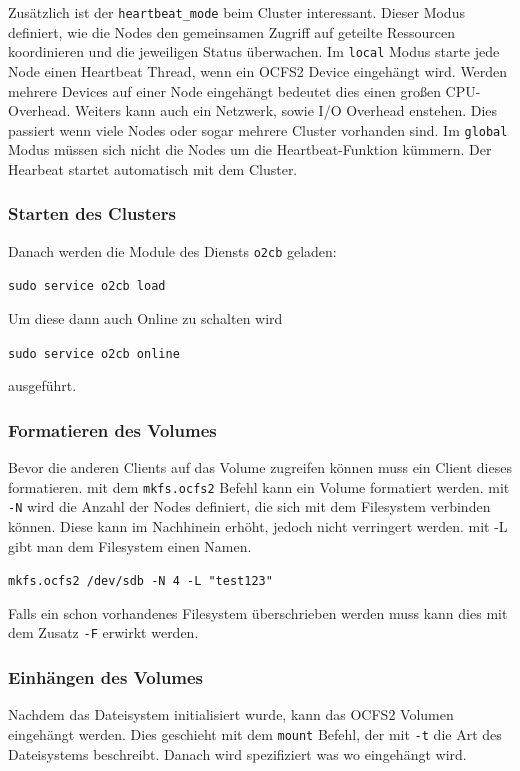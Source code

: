 Zusätzlich ist der \texttt{heartbeat\_mode} beim Cluster interessant. Dieser Modus definiert, wie die Nodes den gemeinsamen Zugriff auf geteilte Ressourcen koordinieren und die jeweiligen Status überwachen. Im \texttt{local} Modus starte jede Node einen Heartbeat Thread, wenn ein OCFS2 Device eingehängt wird. Werden mehrere Devices auf einer Node eingehängt bedeutet dies einen großen CPU-Overhead. Weiters kann auch ein Netzwerk, sowie I/O Overhead enstehen. Dies passiert wenn viele Nodes oder sogar mehrere Cluster vorhanden sind.   Im \texttt{global} Modus müssen sich nicht die Nodes um die Heartbeat-Funktion kümmern. Der Hearbeat startet automatisch mit dem Cluster. \cite{heartbeat}
\subsubsection{Starten des Clusters}
Danach werden die Module des Diensts \texttt{o2cb} geladen:

\texttt{sudo service o2cb load}

Um diese dann auch Online zu schalten wird

\texttt{sudo service o2cb online}

ausgeführt. \cite{ocfs2faq}
\subsubsection{Formatieren des Volumes}
Bevor die anderen Clients auf das Volume zugreifen können muss ein Client dieses formatieren. 
mit dem \texttt{mkfs.ocfs2} Befehl kann ein Volume formatiert werden. mit \texttt{-N} wird die Anzahl der Nodes definiert, die sich mit dem Filesystem verbinden können. Diese kann im Nachhinein erhöht, jedoch nicht verringert werden. mit -L gibt man dem Filesystem einen Namen.

\texttt{mkfs.ocfs2 /dev/sdb -N 4 -L "test123"}

Falls ein schon vorhandenes Filesystem überschrieben werden muss kann dies mit dem Zusatz \texttt{-F} erwirkt werden. 

\subsubsection{Einhängen des Volumes}
Nachdem das Dateisystem initialisiert wurde, kann das OCFS2 Volumen eingehängt werden. Dies geschieht mit dem \texttt{mount} Befehl, der mit \texttt{-t} die Art des Dateisystems beschreibt. Danach wird spezifiziert was wo eingehängt wird. \cite{ocfs2faq}

